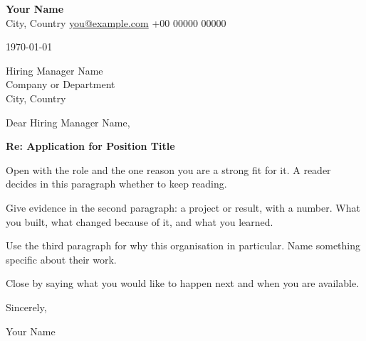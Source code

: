 \documentclass[11pt,a4paper]{article}
\begin{document}
{\Large\bfseries Your Name} \\
City, Country \quad\textbar\quad
\href{mailto:you@example.com}{you@example.com} \quad\textbar\quad
+00 00000 00000

\vspace{1.2em}
\today

Hiring Manager Name \\
Company or Department \\
City, Country

\vspace{0.6em}
Dear Hiring Manager Name,

\textbf{Re: Application for Position Title}

Open with the role and the one reason you are a strong fit for it. A reader
decides in this paragraph whether to keep reading.

Give evidence in the second paragraph: a project or result, with a number.
What you built, what changed because of it, and what you learned.

Use the third paragraph for why this organisation in particular. Name
something specific about their work.

Close by saying what you would like to happen next and when you are available.

Sincerely,

\vspace{2em}
Your Name
\end{document}
